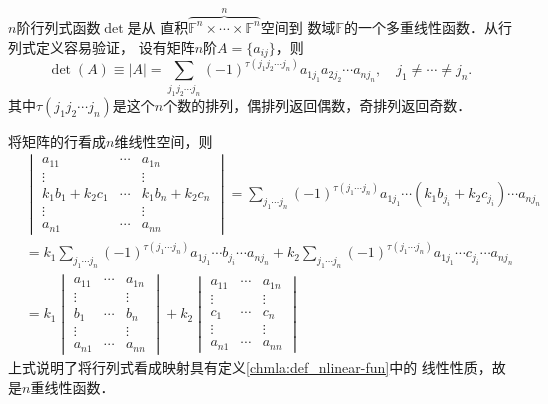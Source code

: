 \begin{example}\label{chmla:exm_det}
    $n$阶行列式函数$\det$是从 
    直积$\overbrace{\mathbb{F}^n \times \cdots \times \mathbb{F}^n}^n$空间到
    数域$\mathbb{F}$的一个多重线性函数．从行列式定义容易验证，
    设有矩阵$n$阶$A=\{a_{ij}\}$，则
    \begin{equation}\label{chmla:eqn_det}
        \det (A) \equiv |A| = \sum_{j_1 j_2\cdots j_n} (-1)^{\tau(j_1 j_2 \cdots j_n)}
           a_{1 j_1} a_{2 j_2}\cdots a_{n j_n} , \quad
           j_1 \neq \cdots \neq j_n .
    \end{equation}
    其中$\tau(j_1 j_2\cdots j_n)$是这个$n$个数的排列，偶排列返回偶数，奇排列返回奇数．

    将矩阵的行看成$n$维线性空间，则
    \begin{align*}
       &\begin{vmatrix}
            a_{11} & \cdots & a_{1n} \\
            \vdots &    & \vdots \\
            k_1 b_1 + k_2 c_1 &\cdots & k_1 b_n + k_2 c_n \\
            \vdots &    & \vdots \\
            a_{n1} & \cdots & a_{nn}
        \end{vmatrix}
        = \sum_{j_1 \cdots j_n} (-1)^{\tau(j_1 \cdots j_n)}
        a_{1 j_1} \cdots (k_1 b_{j_i} + k_2 c_{j_i}) \cdots a_{n j_n}  \\
        &= k_1 \sum_{j_1 \cdots j_n} (-1)^{\tau(j_1 \cdots j_n)}
           a_{1 j_1} \cdots b_{j_i} \cdots a_{n j_n}
         + k_2 \sum_{j_1 \cdots j_n} (-1)^{\tau(j_1 \cdots j_n)}
          a_{1 j_1} \cdots c_{j_i} \cdots a_{n j_n}  \\
        &=k_1 \begin{vmatrix}
            a_{11} & \cdots & a_{1n} \\
            \vdots &    & \vdots \\
             b_1 &\cdots & b_n \\
            \vdots &    & \vdots \\
            a_{n1} & \cdots & a_{nn}
        \end{vmatrix} +
     k_2 \begin{vmatrix}
        a_{11} & \cdots & a_{1n} \\
        \vdots &    & \vdots \\
        c_1 &\cdots & c_n \\
        \vdots &    & \vdots \\
        a_{n1} & \cdots & a_{nn}
    \end{vmatrix}
    \end{align*}
    上式说明了将行列式看成映射具有定义\ref{chmla:def_nlinear-fun}中的
    线性性质，故是$n$重线性函数．
\end{example}

